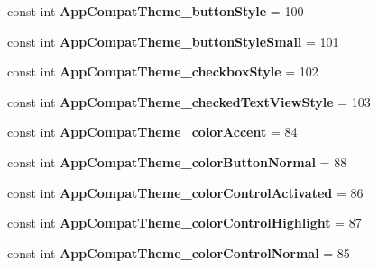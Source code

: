 \begin{DoxyCompactItemize}
const int {\bfseries App\+Compat\+Theme\+\_\+button\+Style} = 100
\item 
\mbox{\label{class_pinned_app_1_1_droid_1_1_resource_1_1_styleable_a3f87ce5ca335057ec2bfff60b49ad7e1}} 
const int {\bfseries App\+Compat\+Theme\+\_\+button\+Style\+Small} = 101
\item 
\mbox{\label{class_pinned_app_1_1_droid_1_1_resource_1_1_styleable_ac83015d7e47fc8c6d9ef4ef37b0014d4}} 
const int {\bfseries App\+Compat\+Theme\+\_\+checkbox\+Style} = 102
\item 
\mbox{\label{class_pinned_app_1_1_droid_1_1_resource_1_1_styleable_ab983dfd2468df8ec7d885f51d9a329f3}} 
const int {\bfseries App\+Compat\+Theme\+\_\+checked\+Text\+View\+Style} = 103
\item 
\mbox{\label{class_pinned_app_1_1_droid_1_1_resource_1_1_styleable_af6881c192424bf174365fde25d508f67}} 
const int {\bfseries App\+Compat\+Theme\+\_\+color\+Accent} = 84
\item 
\mbox{\label{class_pinned_app_1_1_droid_1_1_resource_1_1_styleable_a7adc331cdf7612a622bdd603a2d6dca2}} 
const int {\bfseries App\+Compat\+Theme\+\_\+color\+Button\+Normal} = 88
\item 
\mbox{\label{class_pinned_app_1_1_droid_1_1_resource_1_1_styleable_a51b0062235821d44a264676d6457bfa6}} 
const int {\bfseries App\+Compat\+Theme\+\_\+color\+Control\+Activated} = 86
\item 
\mbox{\label{class_pinned_app_1_1_droid_1_1_resource_1_1_styleable_a5a4cde606ce3ed4616d69bead7fcfdef}} 
const int {\bfseries App\+Compat\+Theme\+\_\+color\+Control\+Highlight} = 87
\item 
\mbox{\label{class_pinned_app_1_1_droid_1_1_resource_1_1_styleable_ab9d0f0abd792bfece9e8e6e6bd5250e8}} 
const int {\bfseries App\+Compat\+Theme\+\_\+color\+Control\+Normal} = 85

\end{DoxyCompactItemize}
